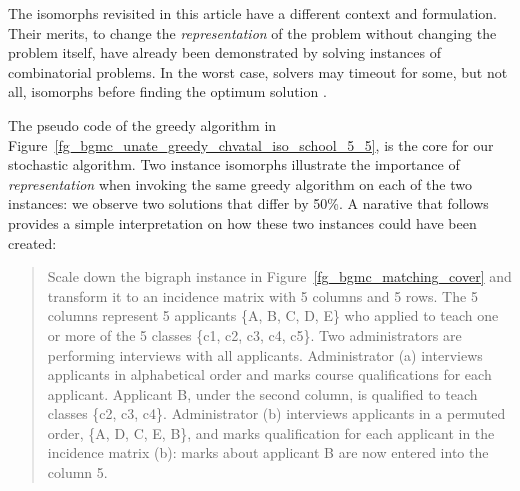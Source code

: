 The isomorphs revisited in this article have a different context
and formulation. Their merits, to change the
{\it representation} of the problem without changing the problem itself,
have already been demonstrated
by solving instances of combinatorial problems. 
In the worst case,  solvers may timeout for some, but not all, isomorphs before finding the optimum solution 
\cite{
OPUS2-2001-BDD-STTT-Harlow,
OPUS2-2001-crossnum-JEA-Stallmann,
OPUS2-2005-sat-AMAI-Brglez,
OPUS2-2005-cover-DAC-Li,
OPUS2-2007-isomorph-ExpCS-Brglez}.
%
%
\par
The pseudo code of the greedy algorithm in 
Figure~\ref{fg_bgmc_unate_greedy_chvatal_iso_school_5_5},
is the core for our stochastic algorithm.
Two instance isomorphs illustrate the  
importance of  {\it representation}
when invoking the same greedy algorithm on each of the two
instances: we observe two solutions that differ by 50\%.
A narative that follows provides a simple interpretation
on how these two instances could have been created:
\begin{quote}
{\small
Scale down the bigraph instance in Figure~\ref{fg_bgmc_matching_cover}
and transform it to an incidence matrix with 5 columns and 5 rows.
The 5 columns represent 5 applicants
\{A, B, C, D, E\} who applied to teach one or more
of the 5 classes \{c1, c2, c3, c4, c5\}.
Two administrators are performing interviews with all applicants.
Administrator (a) interviews applicants in alphabetical order and marks
course qualifications for each applicant. 
Applicant B, under the second column, is qualified to  teach classes \{c2, c3, c4\}.
Administrator (b) interviews applicants in a permuted order, \{A, D, C, E, B\}, and marks %
qualification for each applicant in the incidence matrix (b): 
marks about applicant B are now entered into the column 5.
}
\end{quote}

